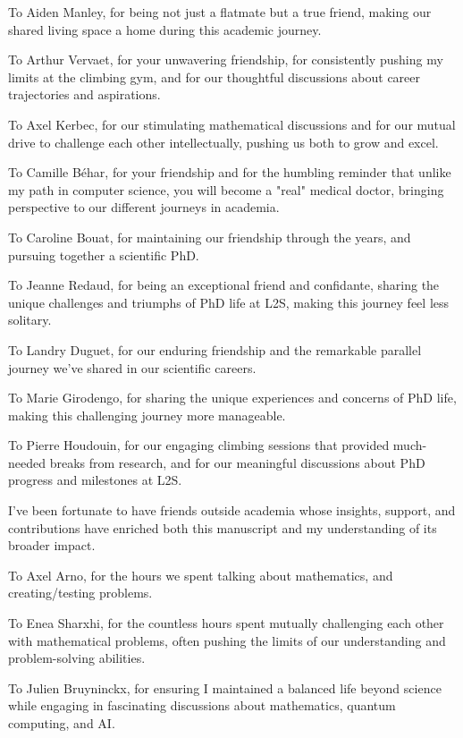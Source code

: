 To Aiden Manley, for being not just a flatmate but a true friend, making our shared living space a home during this academic journey.

To Arthur Vervaet, for your unwavering friendship, for consistently pushing my limits at the climbing gym, and for our thoughtful discussions about career trajectories and aspirations.

To Axel Kerbec, for our stimulating mathematical discussions and for our mutual drive to challenge each other intellectually, pushing us both to grow and excel.

To Camille Béhar, for your friendship and for the humbling reminder that unlike my path in computer science, you will become a "real" medical doctor, bringing perspective to our different journeys in academia.

To Caroline Bouat, for maintaining our friendship through the years, and pursuing together a scientific PhD.

To Jeanne Redaud, for being an exceptional friend and confidante, sharing the unique challenges and triumphs of PhD life at L2S, making this journey feel less solitary.

To Landry Duguet, for our enduring friendship and the remarkable parallel journey we've shared in our scientific careers.

To Marie Girodengo, for sharing the unique experiences and concerns of PhD life, making this challenging journey more manageable.

To Pierre Houdouin, for our engaging climbing sessions that provided much-needed breaks from research, and for our meaningful discussions about PhD progress and milestones at L2S.



I've been fortunate to have friends outside academia whose insights, support, and contributions have enriched both this manuscript and my understanding of its broader impact.

To Axel Arno, for the hours we spent talking about mathematics, and creating/testing problems.

To Enea Sharxhi, for the countless hours spent mutually challenging each other with mathematical problems, often pushing the limits of our understanding and problem-solving abilities.

To Julien Bruyninckx, for ensuring I maintained a balanced life beyond science while engaging in fascinating discussions about mathematics, quantum computing, and AI.

